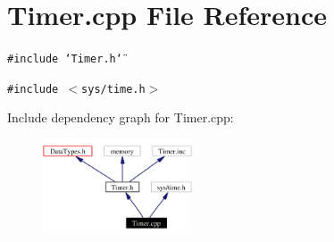 \section{Timer.cpp File Reference}
\label{Timer_8cpp}
{\tt \#include \char`\"{}Timer.h\char`\"{}}\par
{\tt \#include $<$sys/time.h$>$}\par


Include dependency graph for Timer.cpp:\begin{figure}[H]
\begin{center}
\leavevmode
\includegraphics[width=125pt]{Timer_8cpp__incl}
\end{center}
\end{figure}
